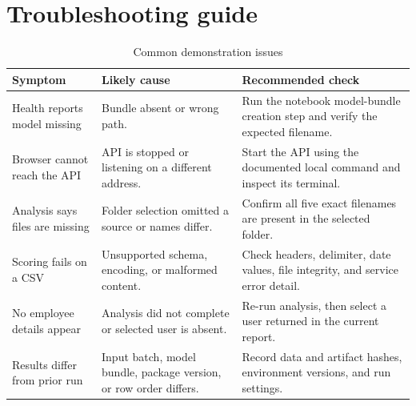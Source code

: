 \documentclass[12pt,a4paper,oneside]{report}
\newcommand{\tablefont}{\small}
\begin{document}
\section{Troubleshooting guide}
\begin{table}[H]
\centering
\tablefont
\caption{Common demonstration issues}
\label{tab:troubleshooting}
\begin{tabularx}{\textwidth}{|p{}|p{}|Y|}
\hline
\textbf{Symptom} & \textbf{Likely cause} & \textbf{Recommended check}\\\hline
Health reports model missing & Bundle absent or wrong path. & Run the notebook model-bundle creation step and verify the expected filename.\\\hline
Browser cannot reach the API & API is stopped or listening on a different address. & Start the API using the documented local command and inspect its terminal.\\\hline
Analysis says files are missing & Folder selection omitted a source or names differ. & Confirm all five exact filenames are present in the selected folder.\\\hline
Scoring fails on a CSV & Unsupported schema, encoding, or malformed content. & Check headers, delimiter, date values, file integrity, and service error detail.\\\hline
No employee details appear & Analysis did not complete or selected user is absent. & Re-run analysis, then select a user returned in the current report.\\\hline
Results differ from prior run & Input batch, model bundle, package version, or row order differs. & Record data and artifact hashes, environment versions, and run settings.\\\hline
\end{tabularx}
\end{table}
\end{document}
